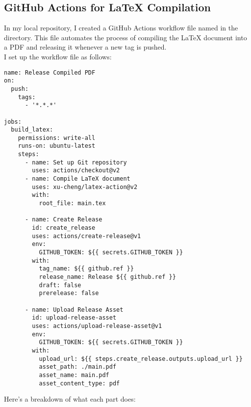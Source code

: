 \documentclass[titlepage]{article}
\begin{document}
\subsection{GitHub Actions for \LaTeX \hspace{0pt} Compilation}
In my local repository, I created a GitHub Actions workflow file named  in the  directory. This file automates the process of compiling the \LaTeX \hspace{0pt} document into a PDF and releasing it whenever a new tag is pushed. 
\vspace{5pt}
\\I set up the workflow file as follows:
\begin{tcolorbox}[codebox]
\begin{lstlisting}
name: Release Compiled PDF 
on:
  push:
    tags:
      - '*.*.*'

jobs:
  build_latex:
    permissions: write-all
    runs-on: ubuntu-latest
    steps:
      - name: Set up Git repository
        uses: actions/checkout@v2
      - name: Compile LaTeX document
        uses: xu-cheng/latex-action@v2
        with:
          root_file: main.tex

      - name: Create Release
        id: create_release
        uses: actions/create-release@v1
        env:
          GITHUB_TOKEN: ${{ secrets.GITHUB_TOKEN }}
        with:
          tag_name: ${{ github.ref }}
          release_name: Release ${{ github.ref }}
          draft: false
          prerelease: false

      - name: Upload Release Asset
        id: upload-release-asset 
        uses: actions/upload-release-asset@v1
        env:
          GITHUB_TOKEN: ${{ secrets.GITHUB_TOKEN }}
        with:
          upload_url: ${{ steps.create_release.outputs.upload_url }} 
          asset_path: ./main.pdf
          asset_name: main.pdf
          asset_content_type: pdf
\end{lstlisting}  
\end{tcolorbox}
\vspace{5pt}
\noindent Here's a breakdown of what each part does:
\end{document}
